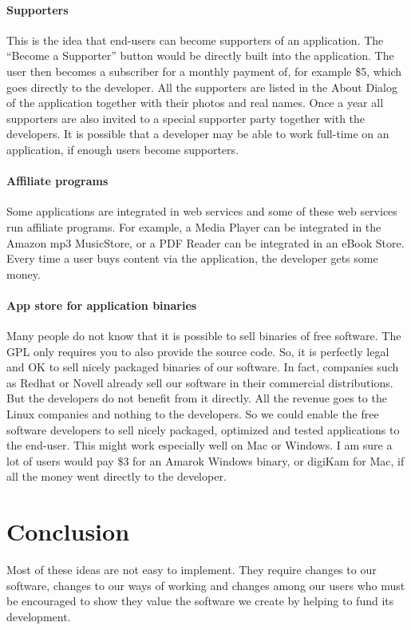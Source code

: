 \paragraph*{Supporters}

This is the idea that end-users can become supporters of an application. The ``Become a Supporter'' button would be directly built into the application. The user then becomes a subscriber for a monthly payment of, for example \$5, which goes directly to the developer. All the supporters are listed in the About Dialog of the application together with their photos and real names. Once a year all supporters are also invited to a special supporter party together with the developers. It is possible that a developer may be able to work full-time on an application, if enough users become supporters.

\paragraph*{Affiliate programs}

Some applications are integrated in web services and some of these web services run affiliate programs. For example, a Media Player can be integrated in the Amazon mp3 MusicStore, or a PDF Reader can be integrated in an eBook Store. Every time a user buys content via the application, the developer gets some money.

\paragraph*{App store for application binaries}

Many people do not know that it is possible to sell binaries of free software. The GPL only requires you to also provide the source code. So, it is perfectly legal and OK to sell nicely packaged binaries of our software. In fact, companies such as Redhat or Novell already sell our software in their commercial distributions. But the developers do not benefit from it directly. All the revenue goes to the Linux companies and nothing to the developers. So we could enable the free software developers to sell nicely packaged, optimized and tested applications to the end-user. This might work especially well on Mac or Windows. I am sure a lot of users would pay \$3 for an Amarok Windows binary, or digiKam for Mac, if all the money went directly to the developer.

\section*{Conclusion}
Most of these ideas are not easy to implement. They require changes to our software, changes to our ways of working and changes among our users who must be encouraged to show they value the software we create by helping to fund its development.

